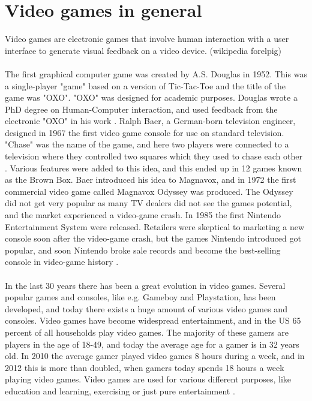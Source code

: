 \section{Video games in general}
Video games are electronic games that involve human interaction with a user interface to generate visual feedback on a video device. (wikipedia forelpig)\\ \\
The first graphical computer game was created by A.S. Douglas in 1952. This was a single-player "game" based on a version of Tic-Tac-Toe and the title of the game was "OXO". "OXO" was designed for academic purposes.  Douglas wrote a PhD degree on Human-Computer interaction, and used feedback from the electronic "OXO" in his work \cite{abouthiginbotham}. Ralph Baer, a German-born television engineer, designed in 1967 the first video game console for use on standard television. "Chase" was the name of the game, and here two players were connected to a television where they controlled two squares which they used to chase each other \cite{videogameHistory}. Various features were added to this idea, and this ended up in 12 games known as the Brown Box. Baer introduced his idea to Magnavox, and in 1972 the first commercial video game called Magnavox Odyssey was produced. The Odyssey did not get very popular as many TV dealers did not see the games potential, and the market experienced a video-game crash.  In 1985 the first Nintendo Entertainment System were released. Retailers were skeptical to marketing a new console soon after the video-game crash, but the games Nintendo introduced got popular, and soon Nintendo broke sale records and become the best-selling console in video-game history \cite{consoleHistory}. \\ \\
In the last 30 years there has been a great evolution in video games. Several popular games and consoles, like e.g. Gameboy and Playstation, has been developed, and today there exists a huge amount of various video games and consoles. Video games have become widespread entertainment, and in the US 65 percent of all households play video games. The majority of these gamers are players in the age of 18-49, and today the average age for a gamer is in 32 years old. In 2010 the average gamer played video games 8 hours during a week, and in 2012 this is more than doubled, when gamers today spends 18 hours a week playing video games.  Video games are used for various different purposes, like education and learning, exercising or just pure entertainment \cite{statistics2010} \cite{statistics2012}. \\ \\
